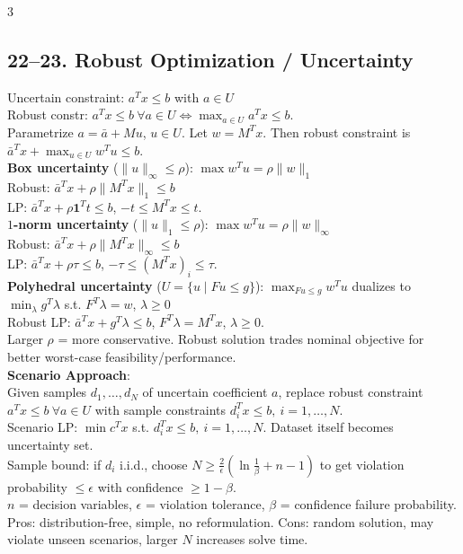 \documentclass[8pt,landscape]{extarticle}
\newcommand{\1}{\mathbf{1}}
\newcommand{\0}{\mathbf{0}}
\begin{document}
\begin{multicols*}{3}
\subsection*{22--23. Robust Optimization / Uncertainty}
Uncertain constraint: $a^Tx\le b$ with $a\in U$ \\
Robust constr: $a^Tx\le b\ \forall a\in U
\iff \max_{a\in U}a^Tx\le b$. \\
Parametrize $a=\bar a+Mu$, $u\in U$. Let $w=M^Tx$.
Then robust constraint is $\bar a^Tx+\max_{u\in U}w^Tu\le b$. \\
\textbf{Box uncertainty} ($\|u\|_\infty\le\rho$):
$\max w^Tu=\rho\|w\|_1$\\
Robust: $\bar a^Tx+\rho\|M^Tx\|_1\le b$\\
LP: $\bar a^Tx+\rho\mathbf1^Tt\le b$, $-t\le M^Tx\le t$. \\
\textbf{$1$-norm uncertainty} ($\|u\|_1\le\rho$):
$\max w^Tu=\rho\|w\|_\infty$ \\
Robust: $\bar a^Tx+\rho\|M^Tx\|_\infty\le b$ \\
LP: $\bar a^Tx+\rho\tau\le b$, $-\tau\le(M^Tx)_i\le\tau$. \\
\textbf{Polyhedral uncertainty} ($U=\{u\mid Fu\le g\}$):
$\max_{Fu\le g}w^Tu$ dualizes to
$\min_\lambda g^T\lambda$ s.t. $F^T\lambda=w$, $\lambda\ge0$\\
Robust LP: $\bar a^Tx+g^T\lambda\le b$, $F^T\lambda=M^Tx$, $\lambda\ge0$. \\
Larger $\rho$ = more conservative. Robust solution trades nominal objective for better worst-case feasibility/performance.\\

\textbf{Scenario Approach}:\\
Given samples $d_1,\ldots,d_N$ of uncertain coefficient $a$,
replace robust constraint $a^Tx\le b\ \forall a\in U$ with sample constraints
$d_i^Tx\le b,\ i=1,\ldots,N$. \\
Scenario LP: $\min c^Tx$ s.t. $d_i^Tx\le b,\ i=1,\ldots,N$. 
Dataset itself becomes uncertainty set. \\
Sample bound: if $d_i$ i.i.d., choose 
$N\ge \frac{2}{\epsilon}\left(\ln\frac1\beta+n-1\right)$
to get violation probability $\le\epsilon$ with confidence $\ge1-\beta$. \\
$n$ = decision variables, $\epsilon$ = violation tolerance, $\beta$ = confidence failure probability.
Pros: distribution-free, simple, no reformulation. 
Cons: random solution, may violate unseen scenarios, larger $N$ increases solve time. \\


\end{multicols*}
\end{document}
